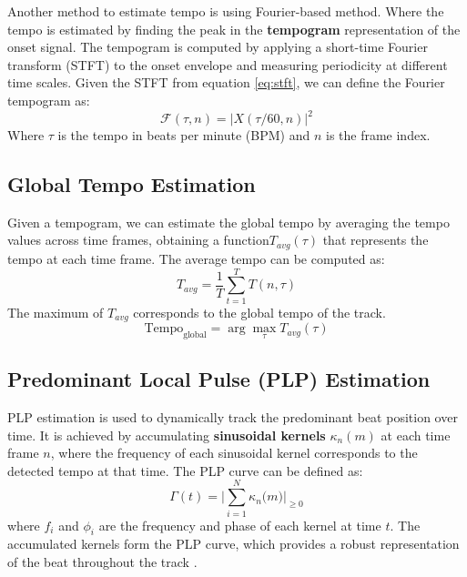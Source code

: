 \documentclass[
paper=A4,               %
pagesize=auto,          %
fontsize=12pt,          %
DIV=16,                 %
twoside=false,           %
BCOR=20mm,              %
parskip=false,          %
chapterprefix=true,     %
appendixprefix=true,    %
listof=totoc,           %
bibliography=totoc,     %
headinclude=true,       %
footinclude=false,      %
headsepline=false,       %
footsepline=false,      %
headings=small,         %
numbers=noenddot        %
] {scrbook}
\begin{document}
Another method to estimate tempo is using Fourier-based method. Where the tempo is estimated by finding the peak in the \textbf{tempogram} representation of the onset signal. The tempogram is computed by applying a short-time Fourier transform (STFT) to the onset envelope and measuring periodicity at different time scales. Given the STFT from equation \ref{eq:stft}, we can define the Fourier tempogram as:
\begin{equation}
    \mathcal{F}(\tau, n) = |X(\tau / 60, n)|^2
\end{equation}
Where $\tau$ is the tempo in beats per minute (BPM) and $n$ is the frame index.

\subsection*{Global Tempo Estimation}
Given a tempogram, we can estimate the global tempo by averaging the tempo values across time frames, obtaining a function$T_{avg}(\tau)$ that represents the tempo at each time frame\cite{bookfmp}. The average tempo can be computed as:
\begin{equation}
    T_{avg} = \frac{1}{T} \sum_{t=1}^{T} T(n, \tau)
\end{equation}
The maximum of $T_{avg}$ corresponds to the global tempo of the track.
\begin{equation}
    \text{Tempo}_{\text{global}} = \arg\max_{\tau} T_{avg}(\tau)
\end{equation}

\subsection*{Predominant Local Pulse (PLP) Estimation}
PLP estimation is used to dynamically track the predominant beat position over time. It is achieved by accumulating \textbf{sinusoidal kernels} $\kappa_n(m)$ at each time frame $n$, where the frequency of each sinusoidal kernel corresponds to the detected tempo at that time. The PLP curve can be defined as:
\begin{equation}
\Gamma(t) = \big|\sum_{i=1}^{N} \kappa_n\bigl(m\bigr)\big|_{\ge 0}
\end{equation}
where \(f_i\) and \(\phi_i\) are the frequency and phase of each kernel at time \(t\). The accumulated kernels form the PLP curve, which provides a robust representation of the beat throughout the track \cite{muller2015beat}.
\end{document}
